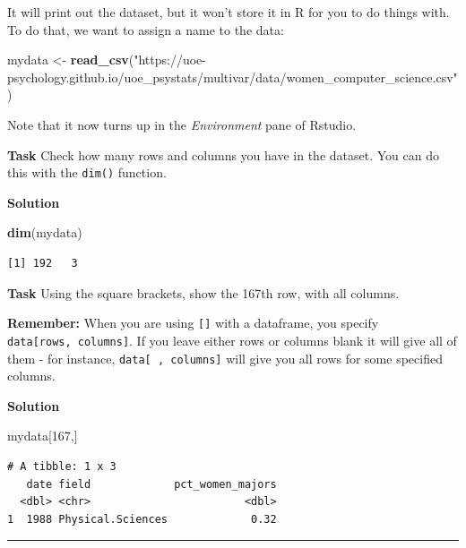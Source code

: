 \documentclass[12pt,]{krantz}
\newenvironment{Shaded}{\begin{snugshade}}{\end{snugshade}}
\newcommand{\DecValTok}[1]{\textcolor[rgb]{0.00,0.00,0.81}{#1}}
\newcommand{\KeywordTok}[1]{\textcolor[rgb]{0.13,0.29,0.53}{\textbf{#1}}}
\newcommand{\NormalTok}[1]{#1}
\newcommand{\StringTok}[1]{\textcolor[rgb]{0.31,0.60,0.02}{#1}}
\begin{document}
It will print out the dataset, but it won't store it in R for you to do things with. To do that, we want to assign a name to the data:

\begin{Shaded}
\begin{Highlighting}[]
\NormalTok{mydata <-}\StringTok{ }\KeywordTok{read_csv}\NormalTok{(}\StringTok{"https://uoe-psychology.github.io/uoe_psystats/multivar/data/women_computer_science.csv"}\NormalTok{)}
\end{Highlighting}
\end{Shaded}

Note that it now turns up in the \emph{Environment} pane of Rstudio.

\textbf{Task}
Check how many rows and columns you have in the dataset.
You can do this with the \texttt{dim()} function.

\textbf{Solution }

\begin{Shaded}
\begin{Highlighting}[]
\KeywordTok{dim}\NormalTok{(mydata)}
\end{Highlighting}
\end{Shaded}

\begin{verbatim}
[1] 192   3
\end{verbatim}

\textbf{Task}
Using the square brackets, show the 167th row, with all columns.

\textbf{Remember:} When you are using \texttt{{[}{]}} with a dataframe, you specify \texttt{data{[}rows,\ columns{]}}. If you leave either rows or columns blank it will give all of them - for instance, \texttt{data{[}\ ,\ columns{]}} will give you all rows for some specified columns.

\textbf{Solution }

\begin{Shaded}
\begin{Highlighting}[]
\NormalTok{mydata[}\DecValTok{167}\NormalTok{,]}
\end{Highlighting}
\end{Shaded}

\begin{verbatim}
# A tibble: 1 x 3
   date field             pct_women_majors
  <dbl> <chr>                        <dbl>
1  1988 Physical.Sciences             0.32
\end{verbatim}

\begin{center}\rule{0.5\linewidth}{0.5pt}\end{center}
\end{document}

